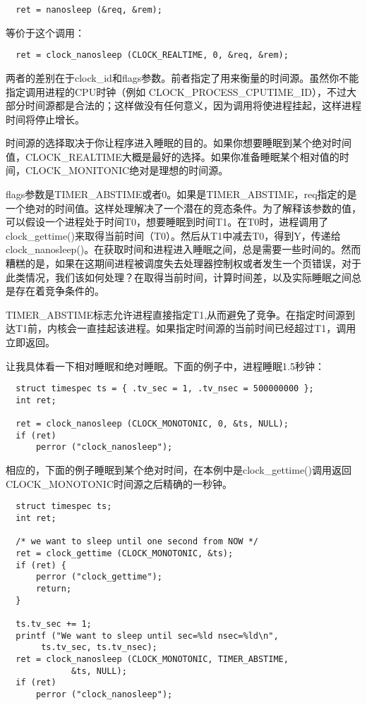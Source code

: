 \begin{lstlisting}
  ret = nanosleep (&req, &rem);
\end{lstlisting}

等价于这个调用： 

\begin{lstlisting}
  ret = clock_nanosleep (CLOCK_REALTIME, 0, &req, &rem);
\end{lstlisting}

两者的差别在于clock\_id和flags参数。前者指定了用来衡量的时间源。虽然你不能指定调用进程的CPU时钟（例如 CLOCK\_PROCESS\_CPUTIME\_ID），不过大部分时间源都是合法的；这样做没有任何意义，因为调用将使进程挂起，这样进程时间将停止增长。

时间源的选择取决于你让程序进入睡眠的目的。如果你想要睡眠到某个绝对时间值，CLOCK\_REALTIME大概是最好的选择。如果你准备睡眠某个相对值的时间，CLOCK\_MONITONIC绝对是理想的时间源。

flags参数是TIMER\_ABSTIME或者0。如果是TIMER\_ABSTIME，req指定的是一个绝对的时间值。这样处理解决了一个潜在的竞态条件。为了解释该参数的值，可以假设一个进程处于时间T0，想要睡眠到时间T1。在T0时，进程调用了clock\_gettime()来取得当前时间（T0）。然后从T1中减去T0，得到Y，传递给clock\_nanosleep()。在获取时间和进程进入睡眠之间，总是需要一些时间的。然而糟糕的是，如果在这期间进程被调度失去处理器控制权或者发生一个页错误，对于此类情况，我们该如何处理？在取得当前时间，计算时间差，以及实际睡眠之间总是存在着竞争条件的。

TIMER\_ABSTIME标志允许进程直接指定T1,从而避免了竞争。在指定时间源到达T1前，内核会一直挂起该进程。如果指定时间源的当前时间已经超过T1，调用立即返回。

让我具体看一下相对睡眠和绝对睡眠。下面的例子中，进程睡眠1.5秒钟： 

\begin{lstlisting}
  struct timespec ts = { .tv_sec = 1, .tv_nsec = 500000000 };
  int ret;

  ret = clock_nanosleep (CLOCK_MONOTONIC, 0, &ts, NULL);
  if (ret)
      perror ("clock_nanosleep");
\end{lstlisting}

相应的，下面的例子睡眠到某个绝对时间，在本例中是clock\_gettime()调用返回CLOCK\_MONOTONIC时间源之后精确的一秒钟。 

\begin{lstlisting}
  struct timespec ts; 
  int ret;

  /* we want to sleep until one second from NOW */
  ret = clock_gettime (CLOCK_MONOTONIC, &ts);
  if (ret) {
      perror ("clock_gettime");
      return;
  }

  ts.tv_sec += 1;
  printf ("We want to sleep until sec=%ld nsec=%ld\n",
	   ts.tv_sec, ts.tv_nsec);
  ret = clock_nanosleep (CLOCK_MONOTONIC, TIMER_ABSTIME,
			 &ts, NULL);
  if (ret)
      perror ("clock_nanosleep");
\end{lstlisting}

